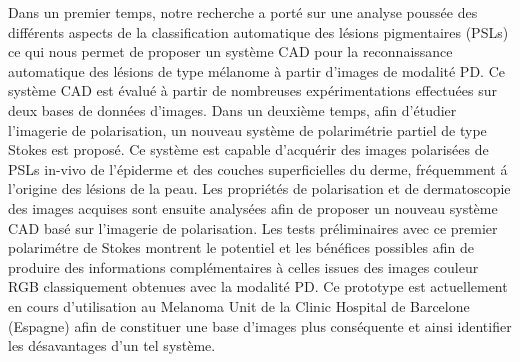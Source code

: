 Dans un premier temps, notre recherche a port\'e sur une analyse pouss\'ee des diff\'erents aspects de la classification automatique des l\'esions pigmentaires (PSLs) ce qui nous permet de proposer un syst\`eme CAD pour la reconnaissance automatique des l\'esions de type m\'elanome \`a partir d'images de modalit\'e PD.
Ce syst\`eme CAD est \'evalu\'e \`a partir de nombreuses exp\'erimentations effectu\'ees sur deux bases de donn\'ees d'images.
Dans un deuxi\`eme temps, afin d'\'etudier l'imagerie de polarisation, un nouveau syst\`eme de polarim\'etrie partiel de type Stokes est propos\'e.
Ce syst\`eme est capable d'acqu\'erir des images polaris\'ees de PSLs in-vivo de l'\'epiderme et des couches superficielles du derme, fr\'equemment \'a l'origine des l\'esions de la peau.
Les propri\'et\'es de polarisation et de dermatoscopie des images acquises sont ensuite analys\'ees afin de proposer un nouveau syst\`eme CAD bas\'e sur l'imagerie de polarisation.
Les tests pr\'eliminaires avec ce premier polarim\'etre de Stokes montrent le potentiel et les b\'en\'efices possibles afin de produire des informations complémentaires \`a celles issues des images couleur RGB classiquement obtenues avec la modalit\'e PD. Ce prototype est actuellement en cours d'utilisation au Melanoma Unit de la Clinic Hospital de Barcelone (Espagne) afin de constituer une base d'images plus cons\'equente et ainsi identifier les d\'esavantages d'un tel syst\`eme.
\cleardoublepage

\doublespacing

\pagestyle{empty}

\pagestyle{fancy}





%		
%



